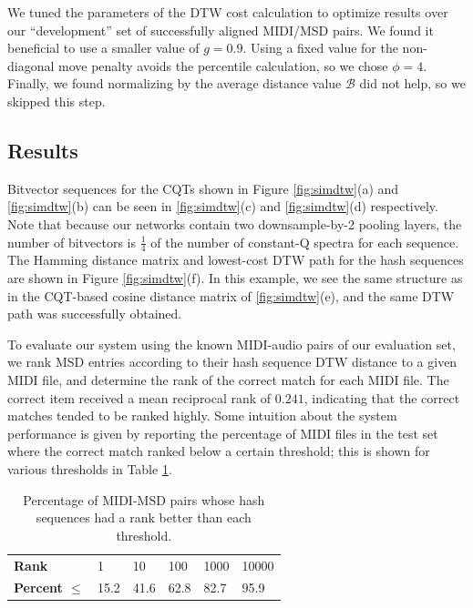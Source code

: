 \documentclass{article}
\begin{document}
We tuned the parameters of the DTW cost calculation to optimize results over our ``development'' set of successfully aligned MIDI/MSD pairs.
We found it beneficial to use a smaller value of $g = 0.9$.
Using a fixed value for the non-diagonal move penalty avoids the percentile calculation, so we chose $\phi = 4$.
Finally, we found normalizing by the average distance value $\mathcal{B}$ did not help, so we skipped this step.

\subsection{Results}

Bitvector sequences for the CQTs shown in Figure \ref{fig:simdtw}(a) and \ref{fig:simdtw}(b) can be seen in \ref{fig:simdtw}(c) and \ref{fig:simdtw}(d) respectively.
Note that because our networks contain two downsample-by-2 pooling layers, the number of bitvectors is $\frac{1}{4}$ of the number of constant-Q spectra for each sequence.
The Hamming distance matrix and lowest-cost DTW path for the hash sequences are shown in Figure \ref{fig:simdtw}(f).
In this example, we see the same structure as in the CQT-based cosine distance matrix of  \ref{fig:simdtw}(e), and the same DTW path was successfully obtained.

To evaluate our system using the known MIDI-audio pairs of our evaluation set, we rank MSD entries according to their hash sequence DTW distance to a given MIDI file, and determine the rank of the correct match for each MIDI file.
The correct item received a mean reciprocal rank of \textbf{$0.241$}, indicating that the correct matches tended to be ranked highly.  
Some intuition about the system performance is given by reporting the percentage of MIDI files in the test set where the correct match ranked below a certain threshold; this is shown for various thresholds in Table \ref{tab:rank-percentages}.

\begin{table}
  \begin{center}
    \begin{tabular}{@{}llllll@{}}
      \toprule
      \textbf{Rank} & 1 & 10 & 100 & 1000 & 10000 \\
      \textbf{Percent $\le$} & 15.2 & 41.6 & 62.8 & 82.7 & 95.9 \\
      \bottomrule
    \end{tabular}
  \end{center}
  \caption{Percentage of MIDI-MSD pairs whose hash sequences had a rank better than each threshold.}
  \label{tab:rank-percentages}
\end{table}
\end{document}

